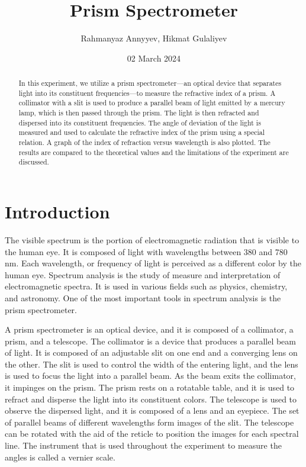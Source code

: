 \documentclass[10pt]{article}
\title{Prism Spectrometer}
\author{Rahmanyaz Annyyev, Hikmat Gulaliyev}
\date{02 March 2024}
\begin{document}
\maketitle

\begin{abstract}
In this experiment, we utilize a prism spectrometer---an optical device that separates light into its constituent frequencies---to measure the refractive index of a prism. A collimator with a slit is used to produce a parallel beam of light emitted by a mercury lamp, which is then passed through the prism. The light is then refracted and dispersed into its constituent frequencies. The angle of deviation of the light is measured and used to calculate the refractive index of the prism using a special relation. A graph of the index of refraction versus wavelength is also plotted. The results are compared to the theoretical values and the limitations of the experiment are discussed.
\end{abstract}

\section{Introduction}

The visible spectrum is the portion of electromagnetic radiation that is visible to the human eye. It is composed of light with wavelengths between 380 and 780 nm. Each wavelength, or frequency of light is perceived as a different color by the human eye\cite{Marcus_1998}. Spectrum analysis is the study of measure and interpretation of electromagnetic spectra. It is used in various fields such as physics, chemistry, and astronomy. One of the most important tools in spectrum analysis is the prism spectrometer. 

A prism spectrometer is an optical device, and it is composed of a collimator, a prism, and a telescope. The collimator is a device that produces a parallel beam of light. It is composed of an adjustable slit on one end and a converging lens on the other. The slit is used to control the width of the entering light, and the lens is used to focus the light into a parallel beam. As the beam exits the collimator, it impinges on the prism. The prism rests on a rotatable table, and it is used to refract and disperse the light into its constituent colors. The telescope is used to observe the dispersed light, and it is composed of a lens and an eyepiece. The set of parallel beams of different wavelengths form images of the slit. The telescope can be rotated with the aid of the reticle to position the images for each spectral line. 
The instrument that is used throughout the experiment to measure the angles is called a vernier scale.
\end{document}
